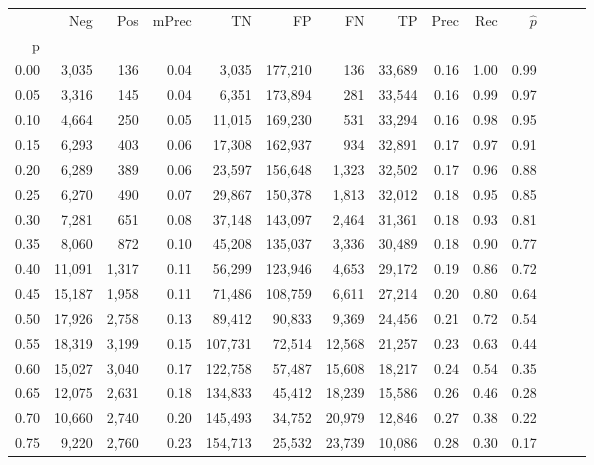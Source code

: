 \begin{tabular}{rrrrrrrrrrrrrr}
\toprule
{} &     Neg &    Pos & mPrec &       TN &       FP &      FN &      TP &  Prec &   Rec & $\hat{p}$ \\
p    &         &        &       &          &          &         &         &       &       &           \\
\midrule
0.00 &   3,035 &    136 &  0.04 &    3,035 &  177,210 &     136 &  33,689 &  0.16 &  1.00 &      0.99 \\
0.05 &   3,316 &    145 &  0.04 &    6,351 &  173,894 &     281 &  33,544 &  0.16 &  0.99 &      0.97 \\
0.10 &   4,664 &    250 &  0.05 &   11,015 &  169,230 &     531 &  33,294 &  0.16 &  0.98 &      0.95 \\
0.15 &   6,293 &    403 &  0.06 &   17,308 &  162,937 &     934 &  32,891 &  0.17 &  0.97 &      0.91 \\
0.20 &   6,289 &    389 &  0.06 &   23,597 &  156,648 &   1,323 &  32,502 &  0.17 &  0.96 &      0.88 \\
0.25 &   6,270 &    490 &  0.07 &   29,867 &  150,378 &   1,813 &  32,012 &  0.18 &  0.95 &      0.85 \\
0.30 &   7,281 &    651 &  0.08 &   37,148 &  143,097 &   2,464 &  31,361 &  0.18 &  0.93 &      0.81 \\
0.35 &   8,060 &    872 &  0.10 &   45,208 &  135,037 &   3,336 &  30,489 &  0.18 &  0.90 &      0.77 \\
0.40 &  11,091 &  1,317 &  0.11 &   56,299 &  123,946 &   4,653 &  29,172 &  0.19 &  0.86 &      0.72 \\
0.45 &  15,187 &  1,958 &  0.11 &   71,486 &  108,759 &   6,611 &  27,214 &  0.20 &  0.80 &      0.64 \\
0.50 &  17,926 &  2,758 &  0.13 &   89,412 &   90,833 &   9,369 &  24,456 &  0.21 &  0.72 &      0.54 \\
0.55 &  18,319 &  3,199 &  0.15 &  107,731 &   72,514 &  12,568 &  21,257 &  0.23 &  0.63 &      0.44 \\
0.60 &  15,027 &  3,040 &  0.17 &  122,758 &   57,487 &  15,608 &  18,217 &  0.24 &  0.54 &      0.35 \\
0.65 &  12,075 &  2,631 &  0.18 &  134,833 &   45,412 &  18,239 &  15,586 &  0.26 &  0.46 &      0.28 \\
0.70 &  10,660 &  2,740 &  0.20 &  145,493 &   34,752 &  20,979 &  12,846 &  0.27 &  0.38 &      0.22 \\
0.75 &   9,220 &  2,760 &  0.23 &  154,713 &   25,532 &  23,739 &  10,086 &  0.28 &  0.30 &      0.17 \\

\end{tabular}
